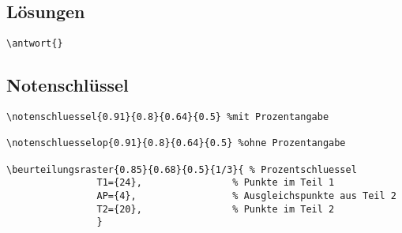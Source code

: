 \documentclass[a4paper,12pt]{report}
\begin{document}
\begin{scriptsize}
\begin{minipage}[t]{0.5\textwidth}
\subsection{Lösungen}
\begin{verbatim}
\antwort{}
\end{verbatim}
\end{minipage}\begin{minipage}[t]{0.5\textwidth}
\subsection{Notenschlüssel}
\begin{verbatim}
\notenschluessel{0.91}{0.8}{0.64}{0.5} %mit Prozentangabe

\notenschluesselop{0.91}{0.8}{0.64}{0.5} %ohne Prozentangabe

\beurteilungsraster{0.85}{0.68}{0.5}{1/3}{ % Prozentschluessel
				T1={24}, 				% Punkte im Teil 1  
				AP={4}, 				% Ausgleichspunkte aus Teil 2  
				T2={20}, 				% Punkte im Teil 2
				}

\end{verbatim}
\end{minipage}

\end{scriptsize}

\fancyhead{}

\end{document}
